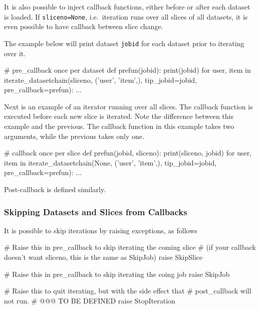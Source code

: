 It is also possible to inject callback functions, either before or
after each dataset is loaded.  If \texttt{sliceno=None},
i.e.\ iteration runs over all slices of all datasets, it is even
possible to have callback between slice change.

The example below will print dataset \texttt{jobid} for each dataset
prior to iterating over it.
\begin{python}
# pre_callback once per dataset
def prefun(jobid):
    print(jobid)
for user, item in iterate_datasetchain(sliceno, ('user', 'item',), tip_jobid=jobid,
                                       pre_callback=prefun):
    ...
\end{python}
Next is an example of an iterator running over all slices.
The callback function is executed before each new slice is iterated.
Note the difference between this example and the previous.  The
callback function in this example takes two arguments, while the
previous takes only one.

\begin{python}
# callback once per slice
def prefun(jobid, sliceno):
    print(sliceno, jobid)
for user, item in iterate_datasetchain(None, ('user', 'item',), tip_jobid=jobid,
                                       pre_callback=prefun):
    ...
\end{python}
Post-callback is defined similarly.



\subsubsection*{Skipping Datasets and Slices from Callbacks}
It is possible to skip iterations by raising exceptions, as follows
\begin{python}

# Raise this in pre_callback to skip iterating the coming slice
# (if your callback doesn't want sliceno, this is the same as SkipJob)
raise SkipSlice

# Raise this in pre_callback to skip iterating the coing job
raise SkipJob

# Raise this to quit iterating, but with the side effect that
# post_callback will not run.
# @@@ TO BE DEFINED
raise StopIteration
\end{python}

